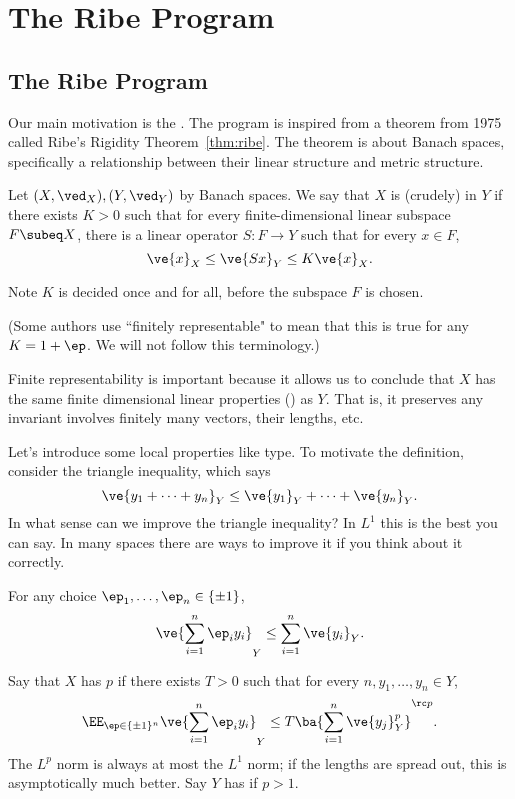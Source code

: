 \chapter{The Ribe Program}



\section{The Ribe Program}
Our main motivation is the . The program is inspired from a theorem from 1975 called Ribe's Rigidity Theorem~\ref{thm:ribe}. The theorem is about Banach spaces, specifically a relationship between their linear structure and metric structure.

\begin{df}
Let $(X,\ved_X), (Y,\ved_Y)$ by Banach spaces. We say that $X$ is (crudely)  in $Y$ if there exists $K>0$ such that for every finite-dimensional linear subspace $F\subeq X$, there is a linear operator $S:F\to Y$ such that for every $x\in F$, 
\[
\ve{x}_X\le \ve{Sx}_Y\le K\ve{x}_X.
\]
\end{df}
Note $K$ is decided once and for all, before the subspace $F$ is chosen.

(Some authors use ``finitely representable" to mean that this is true for any $K=1+\ep$. We will not follow this terminology.)

Finite representability is important because %
it allows us to conclude that $X$ has the same finite dimensional linear properties () as $Y$. That is, it preserves any invariant involves finitely many vectors, their lengths, etc.

Let's introduce some local properties like type. To motivate the definition, 
consider the triangle inequality, which says 
\[
\ve{y_1+\cdots +y_n}_Y\le \ve{y_1}_Y+\cdots +\ve{y_n}_Y.
\]
In what sense can we improve the triangle inequality? In $L^1$ this is the best you can say. In many spaces there are ways to improve it if you think about it correctly.

For any choice $\ep_1,\ldots, \ep_n\in \{\pm 1\}$, 
\[
\ve{\sum_{i=1}^n \ep_i y_i}_Y \le \sum_{i=1}^n \ve{y_i}_Y.
\]
\begin{df}
Say that $X$ has  $p$ if there exists $T>0$ such that for every $n, y_1,\ldots, y_n\in Y$, 
\[
\EE_{\ep\in \{\pm 1\}^n} \ve{\sum_{i=1}^n \ep_i y_i}_Y\le T\ba{\sum_{i=1}^n \ve{y_j}_Y^p}^{\rc p}.
\]
The $L^p$ norm is always at most the $L^1$ norm; if the lengths are spread out, this is asymptotically much better. Say $Y$ has  if $p>1$.
\end{df}

